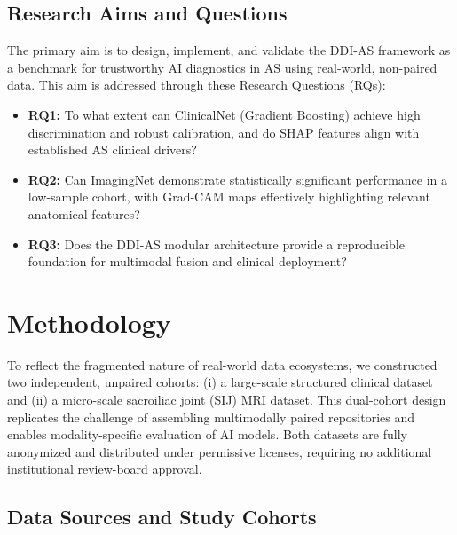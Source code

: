 \documentclass[12pt, a4paper]{article}
\begin{document}
\subsection{Research Aims and Questions}
The primary aim is to design, implement, and validate the DDI-AS framework as a benchmark for trustworthy AI diagnostics in AS using real-world, non-paired data.
This aim is addressed through these Research Questions (RQs):
\begin{itemize}
    \item \textbf{RQ1:} To what extent can ClinicalNet (Gradient Boosting) achieve high discrimination and robust calibration, and do SHAP features align with established AS clinical drivers?
    \item \textbf{RQ2:} Can ImagingNet demonstrate statistically significant performance in a low-sample cohort, with Grad-CAM maps effectively highlighting relevant anatomical features?
    \item \textbf{RQ3:} Does the DDI-AS modular architecture provide a reproducible foundation for multimodal fusion and clinical deployment?
\end{itemize}

\section{Methodology}
To reflect the fragmented nature of real-world data ecosystems, we constructed two independent, unpaired cohorts: (i) a large-scale structured clinical dataset and (ii) a micro-scale sacroiliac joint (SIJ) MRI dataset. This dual-cohort design replicates the challenge of assembling multimodally paired repositories and enables modality-specific evaluation of AI models. Both datasets are fully anonymized and distributed under permissive licenses, requiring no additional institutional review-board approval.

\subsection{Data Sources and Study Cohorts}
\end{document}
